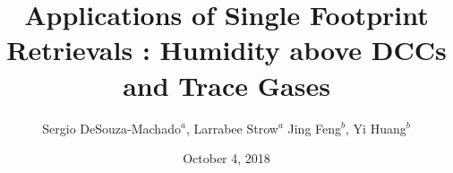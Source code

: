 \documentclass[10pt,t]{beamer}
\begin{document}
\title[]{Applications of Single Footprint Retrievals : \newline Humidity above DCCs and Trace Gases}
\author{Sergio DeSouza-Machado$^{a}$, Larrabee Strow$^{a}$ \newline Jing Feng$^{b}$, Yi Huang$^{b}$}
\date{October 4, 2018}
\begin{frame}
  \titlepage
\end{frame}
\end{document}

